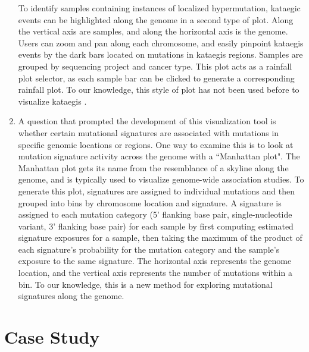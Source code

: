 \documentclass[12pt, letterpaper]{article}
\begin{document}
\begin{enumerate}
To identify samples containing instances of localized hypermutation, kataegic events can be highlighted along the genome in a second type of plot.
Along the vertical axis are samples, and along the horizontal axis is the genome.
Users can zoom and pan along each chromosome, and easily pinpoint kataegis events by the dark bars located on mutations in kataegis regions.
Samples are grouped by sequencing project and cancer type.
This plot acts as a rainfall plot selector, as each sample bar can be clicked to generate a corresponding rainfall plot.
To our knowledge, this style of plot has not been used before to visualize kataegis .
    
\item A question that prompted the development of this visualization tool is whether certain mutational signatures are associated with mutations in specific genomic locations or regions.
One way to examine this is to look at mutation signature activity across the genome with a ``Manhattan plot".
The Manhattan plot gets its name from the resemblance of a skyline along the genome, and is typically used to visualize genome-wide association studies\cite{gibson2010hints}.
To generate this plot, signatures are assigned to individual mutations and then grouped into bins by chromosome location and signature.
A signature is assigned to each mutation category (5' flanking base pair, single-nucleotide variant, 3' flanking base pair) for each sample by first computing estimated signature exposures for a sample, then taking the maximum of the product of each signature's probability for the mutation category and the sample's exposure to the same signature.
The horizontal axis represents the genome location, and the vertical axis represents the number of mutations within a bin.
To our knowledge, this is a new method for exploring mutational signatures along the genome.

\end{enumerate}


\section{Case Study}
\end{document}
